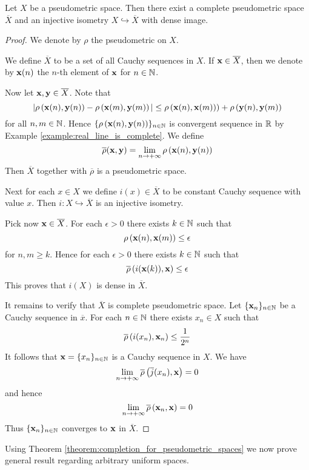 \begin{theorem}\label{theorem:completion_for_pseudometric_spaces}
	Let $X$ be a pseudometric space. Then there exist a complete pseudometric space $\overline{X}$ and an injective isometry $X \hookrightarrow \overline{X}$ with dense image.
\end{theorem}
\begin{proof}
	We denote by $\rho$ the pseudometric on $X$.

	We define $\overline{X}$ to be a set of all Cauchy sequences in $X$. If $\mathbf{x} \in \overline{X}$, then we denote by $\mathbf{x}(n)$ the $n$-th element of $\mathbf{x}$ for $n \in {\mathbb N}$.

	Now let $\mathbf{x}, \mathbf{y} \in \overline{X}$. Note that
	$$|\rho\left(\mathbf{x}(n),\mathbf{y}(n)\right) - \rho\left(\mathbf{x}(m),\mathbf{y}(m)\right)| \leq \rho\left(\mathbf{x}(n),\mathbf{x}(m)\right)) + \rho\left(\mathbf{y}(n),\mathbf{y}(m)\right)$$
	for all $n,m \in {\mathbb N}$. Hence $\{\rho\left(\mathbf{x}(n),\mathbf{y}(n)\right)\}_{n \in {\mathbb N}}$ is convergent sequence in ${\mathbb R}$ by Example \ref{example:real_line_is_complete}. We define
	$$\overline{\rho}(\mathbf{x},\mathbf{y}) = \lim_{n\rightarrow +\infty}\rho\left(\mathbf{x}(n),\mathbf{y}(n)\right)$$
	Then $\overline{X}$ together with $\overline{\rho}$ is a pseudometric space.

	Next for each $x \in X$ we define $i(x) \in \overline{X}$ to be constant Cauchy sequence with value $x$. Then $i:X \hookrightarrow \overline{X}$ is an injective isometry.

	Pick now $\mathbf{x} \in \overline{X}$. For each $\epsilon > 0$ there exists $k \in {\mathbb N}$ such that
	$$\rho\left(\mathbf{x}(n), \mathbf{x}(m)\right) \leq \epsilon$$
	for $n,m \geq k$. Hence for each $\epsilon > 0$ there exists $k \in {\mathbb N}$ such that
	$$\overline{\rho}\left(i(\mathbf{x}(k)), \mathbf{x}\right) \leq \epsilon$$
	This proves that $i(X)$ is dense in $\overline{X}$.

	It remains to verify that $\overline{X}$ is complete pseudometric space. Let $\{\mathbf{x}_n\}_{n \in {\mathbb N}}$ be a Cauchy sequence in $\overline{x}$. For each $n \in {\mathbb N}$ there exists $x_n \in X$ such that
	$$\overline{\rho}\left(i(x_n), \mathbf{x}_n\right) \leq \frac{1}{2^n}$$
	It follows that $\mathbf{x} = \{x_n\}_{n \in {\mathbb N}}$ is a Cauchy sequence in $X$. We have
	$$\lim_{n\rightarrow +\infty}\overline{\rho}\left(\overline{j}(x_n),\mathbf{x}\right) = 0$$
	and hence
	$$\lim_{n\rightarrow +\infty}\overline{\rho}\left(\mathbf{x}_n,\mathbf{x}\right) = 0$$
	Thus $\{\mathbf{x}_n\}_{n \in {\mathbb N}}$ converges to $\mathbf{x}$ in $\overline{X}$.
\end{proof}
\noindent
Using Theorem \ref{theorem:completion_for_pseudometric_spaces} we now prove general result regarding arbitrary uniform spaces.

